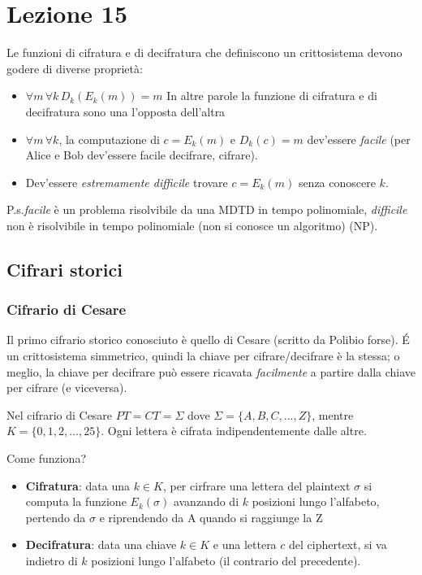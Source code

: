 \section*{Lezione 15}

Le funzioni di cifratura e di decifratura che definiscono un crittosistema devono godere di diverse proprietà:

\begin{itemize}
	\item $\forall m \, \forall k \, D_k(E_k(m)) = m$
	In altre parole la funzione di cifratura e di decifratura sono una l'opposta dell'altra
	\item $\forall m \, \forall k$, la computazione di $c = E_k(m)$ e $D_k(c) = m$ dev'essere \textit{facile} (per Alice e Bob dev'essere facile decifrare, cifrare).
	\item Dev'essere \textit{estremamente difficile} trovare $c = E_k(m)$ senza conoscere $k$.
\end{itemize}

P.s.\textit{facile} è un problema risolvibile da una MDTD in tempo polinomiale, \textit{difficile} non è risolvibile in tempo polinomiale (non si conosce un algoritmo) (NP).

\subsection*{Cifrari storici}

\subsubsection*{Cifrario di Cesare}

Il primo cifrario storico conosciuto è quello di Cesare (scritto da Polibio forse). \'E un crittosistema simmetrico, quindi la chiave per cifrare/decifrare è la stessa; o meglio, la chiave per decifrare può essere ricavata \textit{facilmente} a partire dalla chiave per cifrare (e viceversa).

Nel cifrario di Cesare $PT = CT = \Sigma$ dove $\Sigma = \{A, B, C, ..., Z\}$, mentre $K = \{0, 1, 2, ..., 25\}$. Ogni lettera è cifrata indipendentemente dalle altre.

Come funziona? 
\begin{itemize}
	\item \textbf{Cifratura}: data una $k \in K$, per cirfrare una lettera del plaintext $\sigma$ si computa la funzione $E_k(\sigma)$ avanzando di $k$ posizioni lungo l'alfabeto, pertendo da $\sigma$ e riprendendo da A quando si raggiunge la Z
	\item \textbf{Decifratura}: data una chiave $k \in K$ e una lettera $c$ del ciphertext, si va indietro di $k$ posizioni lungo l'alfabeto (il contrario del precedente).
\end{itemize}

